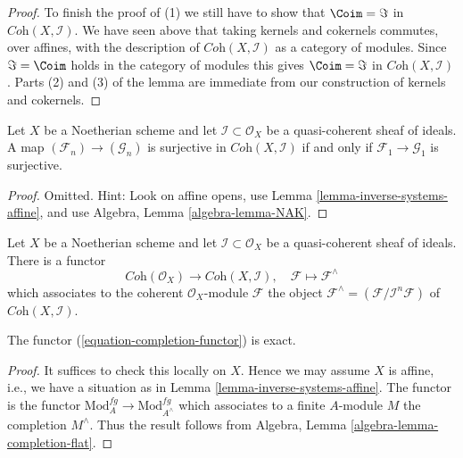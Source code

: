 \begin{proof}
\medskip\noindent
To finish the proof of (1) we still have to show that $\Coim = \Im$
in $\textit{Coh}(X, \mathcal{I})$. We have seen above that taking
kernels and cokernels commutes, over affines, with the description
of $\textit{Coh}(X, \mathcal{I})$ as a category of modules. Since
$\Im = \Coim$ holds in the category of modules
this gives $\Coim = \Im$ in $\textit{Coh}(X, \mathcal{I})$.
Parts (2) and (3) of the lemma are immediate from our construction
of kernels and cokernels.
\end{proof}

\begin{lemma}
\label{lemma-inverse-systems-surjective}
Let $X$ be a Noetherian scheme and let $\mathcal{I} \subset \mathcal{O}_X$
be a quasi-coherent sheaf of ideals. A map
$(\mathcal{F}_n) \to (\mathcal{G}_n)$ is surjective in
$\textit{Coh}(X, \mathcal{I})$
if and only if $\mathcal{F}_1 \to \mathcal{G}_1$ is surjective.
\end{lemma}

\begin{proof}
Omitted. Hint: Look on affine opens, use
Lemma \ref{lemma-inverse-systems-affine}, and use
Algebra, Lemma \ref{algebra-lemma-NAK}.
\end{proof}

\noindent
Let $X$ be a Noetherian scheme and let $\mathcal{I} \subset \mathcal{O}_X$
be a quasi-coherent sheaf of ideals. There is a functor
\begin{equation}
\label{equation-completion-functor}
\textit{Coh}(\mathcal{O}_X) \longrightarrow \textit{Coh}(X, \mathcal{I}), \quad
\mathcal{F} \longmapsto \mathcal{F}^\wedge
\end{equation}
which associates to the coherent $\mathcal{O}_X$-module $\mathcal{F}$
the object $\mathcal{F}^\wedge = (\mathcal{F}/\mathcal{I}^n\mathcal{F})$
of $\textit{Coh}(X, \mathcal{I})$.

\begin{lemma}
\label{lemma-exact}
The functor (\ref{equation-completion-functor}) is exact.
\end{lemma}

\begin{proof}
It suffices to check this locally on $X$. Hence we may assume $X$ is
affine, i.e., we have a situation as in
Lemma \ref{lemma-inverse-systems-affine}.
The functor is the functor $\text{Mod}^{fg}_A \to \text{Mod}^{fg}_{A^\wedge}$
which associates to a finite $A$-module $M$ the completion $M^\wedge$.
Thus the result follows from
Algebra, Lemma \ref{algebra-lemma-completion-flat}.
\end{proof}

